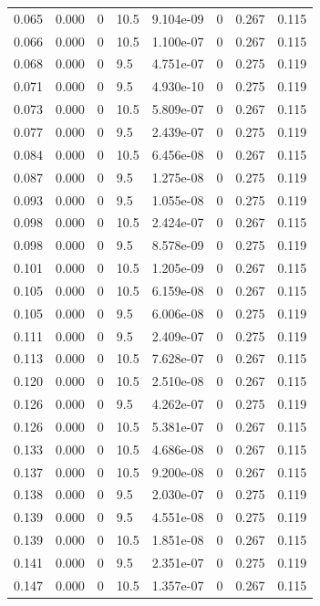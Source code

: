 \documentclass[preview]{standalone}
\begin{document}
{{\begin{tabular}{L{1.2cm}C{1.2cm} C{0.3cm}C{0.5cm} C{1.4cm}C{1.4cm} C{1.4cm}C{1.4cm}}
  0.065  &  0.000  & 0     & 10.5 &  9.104e-09  & 0  & 0.267 &  0.115   \\ 
  0.066  &  0.000  & 0     & 10.5 &  1.100e-07  & 0  & 0.267 &  0.115   \\ 
  0.068  &  0.000  & 0     & 9.5 &  4.751e-07  & 0  & 0.275 &  0.119   \\ 
  0.071  &  0.000  & 0     & 9.5 &  4.930e-10  & 0  & 0.275 &  0.119   \\ 
  0.073  &  0.000  & 0     & 10.5 &  5.809e-07  & 0  & 0.267 &  0.115   \\ 
  0.077  &  0.000  & 0     & 9.5 &  2.439e-07  & 0  & 0.275 &  0.119   \\ 
  0.084  &  0.000  & 0     & 10.5 &  6.456e-08  & 0  & 0.267 &  0.115   \\ 
  0.087  &  0.000  & 0     & 9.5 &  1.275e-08  & 0  & 0.275 &  0.119   \\ 
  0.093  &  0.000  & 0     & 9.5 &  1.055e-08  & 0  & 0.275 &  0.119   \\ 
  0.098  &  0.000  & 0     & 10.5 &  2.424e-07  & 0  & 0.267 &  0.115   \\ 
  0.098  &  0.000  & 0     & 9.5 &  8.578e-09  & 0  & 0.275 &  0.119   \\ 
  0.101  &  0.000  & 0     & 10.5 &  1.205e-09  & 0  & 0.267 &  0.115   \\ 
  0.105  &  0.000  & 0     & 10.5 &  6.159e-08  & 0  & 0.267 &  0.115   \\ 
  0.105  &  0.000  & 0     & 9.5 &  6.006e-08  & 0  & 0.275 &  0.119   \\ 
  0.111  &  0.000  & 0     & 9.5 &  2.409e-07  & 0  & 0.275 &  0.119   \\ 
  0.113  &  0.000  & 0     & 10.5 &  7.628e-07  & 0  & 0.267 &  0.115   \\ 
  0.120  &  0.000  & 0     & 10.5 &  2.510e-08  & 0  & 0.267 &  0.115   \\ 
  0.126  &  0.000  & 0     & 9.5 &  4.262e-07  & 0  & 0.275 &  0.119   \\ 
  0.126  &  0.000  & 0     & 10.5 &  5.381e-07  & 0  & 0.267 &  0.115   \\ 
  0.133  &  0.000  & 0     & 10.5 &  4.686e-08  & 0  & 0.267 &  0.115   \\ 
  0.137  &  0.000  & 0     & 10.5 &  9.200e-08  & 0  & 0.267 &  0.115   \\ 
  0.138  &  0.000  & 0     & 9.5 &  2.030e-07  & 0  & 0.275 &  0.119   \\ 
  0.139  &  0.000  & 0     & 9.5 &  4.551e-08  & 0  & 0.275 &  0.119   \\ 
  0.139  &  0.000  & 0     & 10.5 &  1.851e-08  & 0  & 0.267 &  0.115   \\ 
  0.141  &  0.000  & 0     & 9.5 &  2.351e-07  & 0  & 0.275 &  0.119   \\ 
  0.147  &  0.000  & 0     & 10.5 &  1.357e-07  & 0  & 0.267 &  0.115   \\ 
\hline 
\end{tabular} 

}}
\end{document}
